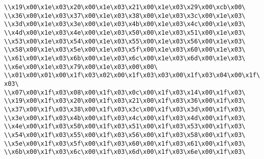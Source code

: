 \verb|\\x19\x00\x1e\x03\x20\x00\x1e\x03\x21\x00\x1e\x03\x29\x00\xcb\x00\|\newline
\verb|\\x36\x00\x1e\x03\x37\x00\x1e\x03\x38\x00\x1e\x03\x3c\x00\x1e\x03\|\newline
\verb|\\x3d\x00\x1e\x03\x3e\x00\x1e\x03\x4b\x00\x1e\x03\x4c\x00\x1e\x03\|\newline
\verb|\\x4d\x00\x1e\x03\x4e\x00\x1e\x03\x50\x00\x1e\x03\x51\x00\x1e\x03\|\newline
\verb|\\x53\x00\x1e\x03\x54\x00\x1e\x03\x55\x00\x1e\x03\x56\x00\x1e\x03\|\newline
\verb|\\x58\x00\x1e\x03\x5e\x00\x1e\x03\x5f\x00\x1e\x03\x60\x00\x1e\x03\|\newline
\verb|\\x61\x00\x1e\x03\x6b\x00\x1e\x03\x6c\x00\x1e\x03\x6d\x00\x1e\x03\|\newline
\verb|\\x6e\x00\x1e\x03\x79\x00\x1e\x03\x00\x00\|\newline
\verb|\\x01\x00\x01\x00\x1f\x03\x02\x00\x1f\x03\x03\x00\x1f\x03\x04\x00\x1f\x03\|\newline
\verb|\\x07\x00\x1f\x03\x08\x00\x1f\x03\x0c\x00\x1f\x03\x14\x00\x1f\x03\|\newline
\verb|\\x19\x00\x1f\x03\x20\x00\x1f\x03\x21\x00\x1f\x03\x36\x00\x1f\x03\|\newline
\verb|\\x37\x00\x1f\x03\x38\x00\x1f\x03\x3c\x00\x1f\x03\x3d\x00\x1f\x03\|\newline
\verb|\\x3e\x00\x1f\x03\x4b\x00\x1f\x03\x4c\x00\x1f\x03\x4d\x00\x1f\x03\|\newline
\verb|\\x4e\x00\x1f\x03\x50\x00\x1f\x03\x51\x00\x1f\x03\x53\x00\x1f\x03\|\newline
\verb|\\x54\x00\x1f\x03\x55\x00\x1f\x03\x56\x00\x1f\x03\x58\x00\x1f\x03\|\newline
\verb|\\x5e\x00\x1f\x03\x5f\x00\x1f\x03\x60\x00\x1f\x03\x61\x00\x1f\x03\|\newline
\verb|\\x6b\x00\x1f\x03\x6c\x00\x1f\x03\x6d\x00\x1f\x03\x6e\x00\x1f\x03\|\newline
